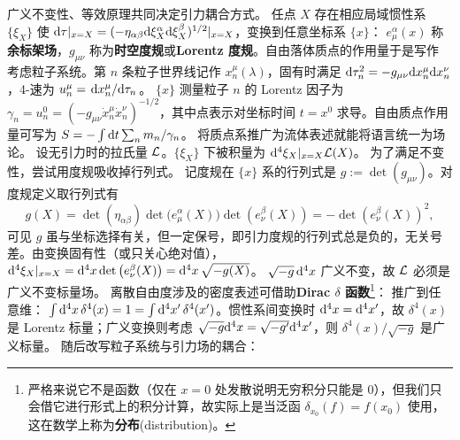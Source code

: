 广义不变性、等效原理共同决定引力耦合方式。
任点 $X$ 存在相应局域惯性系 $\{\xi_X\}$ 使
$\dd\tau |_{x=X} = (-\eta_{\alpha\beta}\dd\xi_X^\alpha\dd\xi_X^\beta)^{1/2} |_{x=X}$，变换到任意坐标系 $\{x\}$：
$e^\alpha_\mu(x)$ 称\textbf{余标架场}，$g_{\mu\nu}$ 称为\textbf{时空度规}或\textbf{Lorentz 度规}。自由落体质点的作用量于是写作
考虑粒子系统。第 $n$ 条粒子世界线记作 $x_n^\mu(\lambda)$，固有时满足 $\dd\tau_n^2=- g_{\mu\nu}\dd x^\mu_n\dd x^\nu_n$，4-速为 $u_n^\mu=\dv*{x_n^\mu}{\tau_n}$。
$\{x\}$ 测量粒子 $n$ 的 Lorentz 因子为 $\gamma_n=u_n^0=(-g_{\mu\nu}\dot x^\mu_n\dot x^\nu_n)^{-1/2}$，其中点表示对坐标时间 $t=x^0$ 求导。自由质点作用量可写为 $S = -\int\dd{t}\sum_n {m_n}/{\gamma_n}$。
将质点系推广为流体表述就能将语言统一为场论。
设无引力时的拉氏量 $\mathcal{L}$。$\{\xi_X\}$ 下被积量为 $\dd[4]\xi_X|_{x=X}\mathcal{L}(X)$。
为了满足不变性，尝试用度规吸收掉行列式。
记度规在 $\{x\}$ 系的行列式是 $g:=\det(g_{\mu\nu})$。对度规定义取行列式有
\[g(X)=\det(\eta_{\alpha\beta})\det\big(e^\alpha_\mu(X)\big)\det(e^\beta_\nu(X))=-\det(e^\beta_\nu(X))^{2},\]
可见 $g$ 虽与坐标选择有关，但一定保号，即引力度规的行列式总是负的，无关号差。由变换固有性（或只关心绝对值），$\dd[4]\xi_X|_{x=X} = \dd[4]{x} \det\big(e^\beta_\nu(X)\big) = \dd[4]{x}\sqrt{-g(X)}$。
$\sqrt{-g}\dd[4]{x}$ 广义不变，故 $\mathcal{L}$ 必须是广义不变标量场。
离散自由度涉及的密度表述可借助\textbf{Dirac $\delta$ 函数}\footnote{严格来说它不是函数（仅在 $x=0$ 处发散说明无穷积分只能是 0），但我们只会借它进行形式上的积分计算，故实际上是当泛函 $\delta_{x_0}(f)=f(x_0)$ 使用，这在数学上称为\textbf{分布}(distribution)。}：
推广到任意维：
$\int\dd[4]{x}\delta^4(x)=1=\int\dd[4]{x'}\delta^4(x')$。惯性系间变换时 $\dd[4]x=\dd[4]x'$，故 $\delta^4(x)$ 是 Lorentz 标量；广义变换则考虑 $\sqrt{-g}\dd[4]x=\sqrt{-g'}\dd[4]x'$，则 $\delta^4(x)/\sqrt{-g}$ 是广义标量。
随后改写粒子系统与引力场的耦合：
